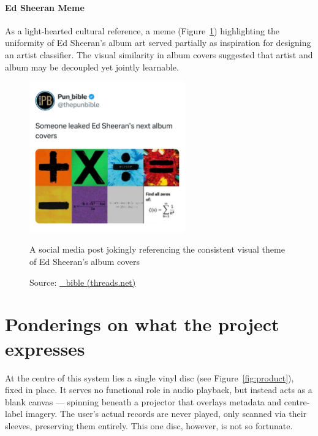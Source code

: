 \begin{uomappendix}
                \paragraph{Ed Sheeran Meme} As a light-hearted cultural reference, a meme (Figure~\ref{fig:EdMeme}) highlighting the uniformity of Ed Sheeran’s album art served partially as inspiration for designing an artist classifier. The visual similarity in album covers suggested that artist and album may be decoupled yet jointly learnable.
    
                \begin{figure}[H]
                    \centering
                    \includegraphics[width=0.6\textwidth]{images/EdSheeranMeme.jpg}
                    \caption{A social media post jokingly referencing the consistent visual theme of Ed Sheeran's album covers}
                    \label{fig:EdMeme}
                    \caption*{Source: \href{https://www.threads.net/@pun_bible/post/DB83pw3gZSh/media}{\@pun\_bible (threads.net)}}
                \end{figure}
    
        \section{Ponderings on what the project expresses} \label{sec:nailArt}
    
        At the centre of this system lies a single vinyl disc (see Figure~\ref{fig:product}), fixed in place. It serves no functional role in audio playback, but instead acts as a blank canvas — spinning beneath a projector that overlays metadata and centre-label imagery. The user’s actual records are never played, only scanned via their sleeves, preserving them entirely. This one disc, however, is not so fortunate.
    

\end{uomappendix}
